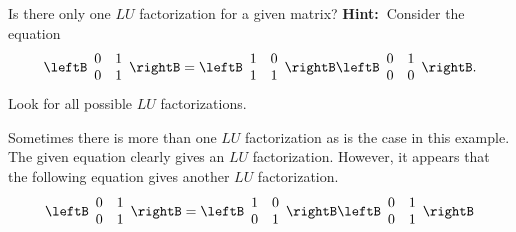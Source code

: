 \begin{enumialphparenastyle}
\begin{ex} Is there only one $LU$ factorization for a given matrix? \textbf{
Hint:\ }Consider the equation 
\begin{equation*}
\leftB 
\begin{array}{rr}
0 & 1 \\ 
0 & 1
\end{array}
\rightB =\leftB 
\begin{array}{rr}
1 & 0 \\ 
1 & 1
\end{array}
\rightB \leftB 
\begin{array}{rr}
0 & 1 \\ 
0 & 0
\end{array}
\rightB .
\end{equation*}
Look for all possible $LU$ factorizations.
\begin{sol}
Sometimes there is more than one $LU$ factorization as is the case in this
example. The given equation clearly gives an $LU$ factorization. However, it
appears that the following equation gives another $LU$ factorization. 
\[
\leftB
\begin{array}{cc}
0 & 1 \\
0 & 1
\end{array}
\rightB =\leftB
\begin{array}{cc}
1 & 0 \\
0 & 1
\end{array}
\rightB \leftB
\begin{array}{cc}
0 & 1 \\
0 & 1
\end{array}
\rightB
\] 
\end{sol}
\end{ex}

\end{enumialphparenastyle}